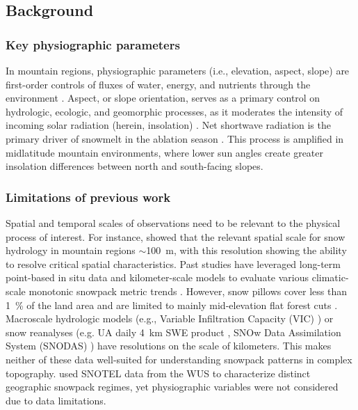 % 
\subsection{Background}
\subsubsection{Key physiographic parameters}
In mountain regions, physiographic parameters (i.e., elevation, aspect, slope) are first-order controls of fluxes of water, energy, and nutrients through the environment \citep{pelletierWhichWayYou2018a}. Aspect, or slope orientation, serves as a primary control on hydrologic, ecologic, and geomorphic processes, as it moderates the intensity of incoming solar radiation (herein, insolation) \citep{broxtonRoleAspectQuantify2009}. Net shortwave radiation is the primary driver of snowmelt in the ablation season \citep{marksClimateEnergyExchange1992a}. This process is amplified in midlatitude mountain environments, where lower sun angles create greater insolation differences between north and south-facing slopes. 

\subsubsection{Limitations of previous work}

Spatial and temporal scales of observations need to be relevant to the physical process of interest. For instance, \cite{bloschlScalingIssuesSnow1999} showed that the relevant spatial scale for snow hydrology in mountain regions $\sim$100~m, with this resolution showing the ability to resolve critical spatial characteristics. Past studies have leveraged long-term point-based in situ data \citep{clowChangesTimingSnowmelt2010,harpoldChangesSnowpackAccumulation2012a,kapnickCausesRecentChanges2012,musselmanWinterMeltTrends2021} and kilometer-scale models to evaluate various climatic-scale monotonic snowpack metric trends 
\citep{moteDECLININGMOUNTAINSNOWPACK2005, moteDramaticDeclinesSnowpack2018, zengSnowpackChange19822018, haleDriversSpatiotemporalPatterns2023}. However, snow pillows cover less than 1~\% of the land area and are limited to mainly mid-elevation flat forest cuts \citep{guan20102011Snow2013}. Macroscale hydrologic models (e.g., Variable Infiltration Capacity (VIC) \citep{liangSimpleHydrologicallyBased1994}) or snow reanalyses (e.g. UA daily 4~km SWE product \citep{broxtonLinkingSnowfallSnow2016}, SNOw Data Assimilation System (SNODAS) \citep{barrettNationalOperationalHydrologic2003}) have resolutions on the scale of kilometers. This makes neither of these data well-suited for understanding snowpack patterns in complex topography. \cite{trujilloSnowpackRegimesWestern2014} used SNOTEL data from the WUS to characterize distinct geographic snowpack regimes, yet physiographic variables were not considered due to data limitations.

